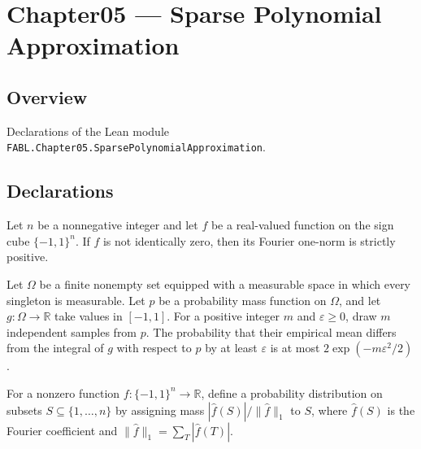 \chapter{Chapter05 — Sparse Polynomial Approximation}
\section{Overview}

Declarations of the Lean module \texttt{FABL.Chapter05.SparsePolynomialApproximation}.

\section{Declarations}

\begin{theorem}
\label{FABL.fourierOneNorm_pos_of_ne_zero}
\leanok
{}
Let $n$ be a nonnegative integer and let $f$ be a real-valued function on the sign cube
$\{-1,1\}^n$. If $f$ is not identically zero, then its Fourier one-norm is strictly
positive.
\end{theorem}

\begin{theorem}
\label{FABL.measure_finitePMFEmpiricalMean_sub_integral_ge_le}
\leanok
{}
Let $\Omega$ be a finite nonempty set equipped with a measurable space in which every
singleton is measurable. Let $p$ be a probability mass function on $\Omega$, and let
$g:\Omega\to\mathbb R$ take values in $[-1,1]$. For a positive integer $m$ and
$\varepsilon\ge 0$, draw $m$ independent samples from $p$. The probability that their
empirical mean differs from the integral of $g$ with respect to $p$ by at least
$\varepsilon$ is at most $2\exp(-m\varepsilon^2/2)$.
\end{theorem}

\begin{definition}
\label{FABL.fourierAtomPMF}
\leanok
{}
For a nonzero function $f:\{-1,1\}^n\to\mathbb R$, define a probability distribution on
subsets $S\subseteq\{1,\ldots,n\}$ by assigning mass $|\widehat f(S)|/\|\widehat f\|_1$
to $S$, where $\widehat f(S)$ is the Fourier coefficient and $\|\widehat
f\|_1=\sum_T|\widehat f(T)|$.
\end{definition}

